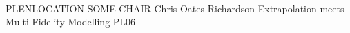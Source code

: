 	\\\hline
	{PLENLOCATION}	%
	{SOME CHAIR}		%
	{Chris Oates}	%
	{Richardson Extrapolation meets Multi-Fidelity Modelling}		%
	{PL06}			%
	\\\hline
